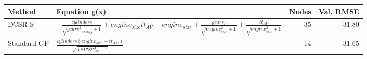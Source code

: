 \begin{tabular}{lp{9cm}rr}
\toprule
Method & Equation g(x) & Nodes & Val. RMSE \\
\midrule
DCSR-S & $- \frac{cylinders}{\sqrt{gears_{missing}^{2} + 1}} + engine_{size} tt_{AV} - engine_{size} + \frac{gears_{f}}{\sqrt{engine_{size}^{2} + 1}} + \frac{tt_{AV}}{\sqrt{engine_{size}^{2} + 1}}$ & 35 & 31.80 \\
Standard GP & $\frac{cylinders \left(engine_{size} + tt_{AM}\right)}{\sqrt{5.8178 tt_{AV}^{2} + 1}}$ & 14 & 31.65 \\
\bottomrule
\end{tabular}

